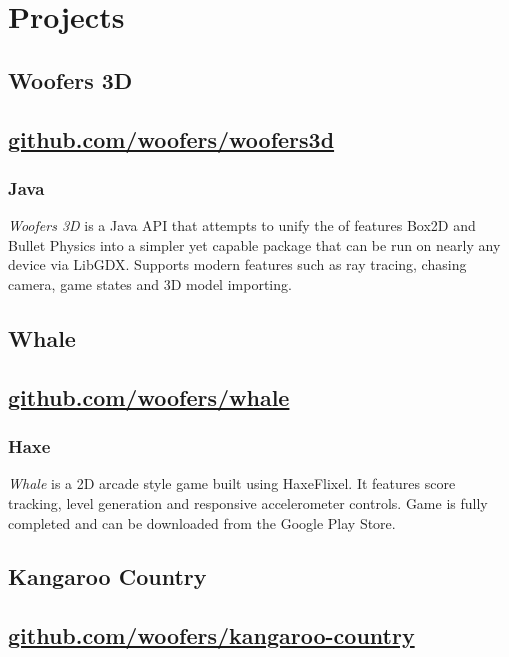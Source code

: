 \documentclass[letterpaper]{article}
\date{}
\title{}
\begin{document}

\section{Projects}
\label{sec-1}
\subsection{Woofers 3D}
\label{sec-1-1}
\subsection{\href{https://github.com/woofers/woofers3d}{github.com/woofers/woofers3d}}
\label{sec-1-2}
\subsubsection{Java}
\label{sec-1-2-1}
\emph{Woofers 3D} is a Java API that attempts to unify the of features Box2D and Bullet Physics into a simpler yet capable package that can be run on nearly any device via LibGDX. Supports modern features such as ray tracing, chasing camera, game states and 3D model importing.
\subsection{Whale}
\label{sec-1-3}
\subsection{\href{https://github.com/woofers/whale}{github.com/woofers/whale}}
\label{sec-1-4}
\subsubsection{Haxe}
\label{sec-1-4-1}
\emph{Whale} is a 2D arcade style game built using HaxeFlixel. It features score tracking, level generation and responsive accelerometer controls. Game is fully completed and can be downloaded from the Google Play Store.
\subsection{Kangaroo Country}
\label{sec-1-5}
\subsection{\href{https://github.com/woofers/kangaroo-country}{github.com/woofers/kangaroo-country}}
\label{sec-1-6}
\end{document}
